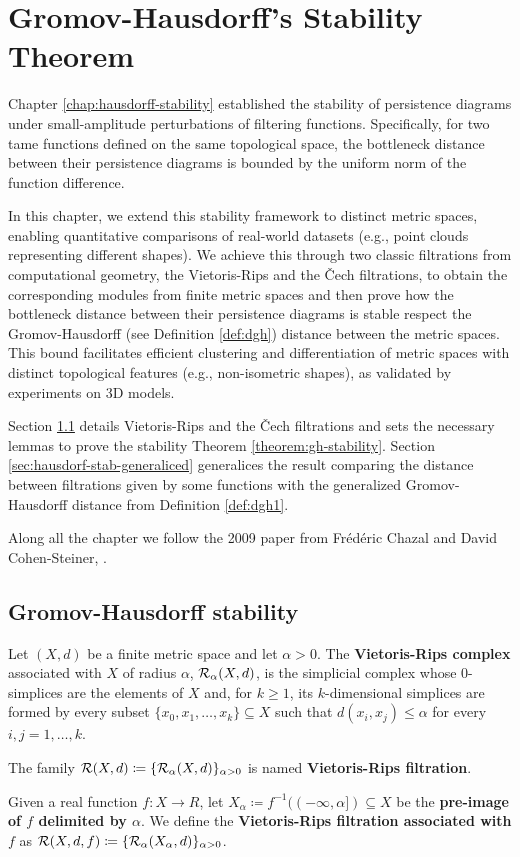 \chapter{Gromov-Hausdorff's Stability Theorem} \label{chapter:gromov-hausdorf-stability}
Chapter \ref{chap:hausdorff-stability} established the stability of persistence diagrams under small-amplitude perturbations of filtering functions. Specifically, for two tame functions defined on the same topological space, the bottleneck distance between their persistence diagrams is bounded by the uniform norm of the function difference.

In this chapter, we extend this stability framework to distinct metric spaces, enabling quantitative comparisons of real-world datasets (e.g., point clouds representing different shapes). We achieve this through two classic filtrations from computational geometry, the Vietoris-Rips and the Čech filtrations, to obtain the corresponding modules from finite metric spaces and then prove how the bottleneck distance between their persistence diagrams is stable respect the Gromov-Hausdorff (see Definition \ref{def:dgh}) distance between the metric spaces. This bound facilitates efficient clustering and differentiation of metric spaces with distinct topological features (e.g., non-isometric shapes), as validated by experiments on 3D models. 

Section \ref{sec:hausdorf-stab} details Vietoris-Rips and the Čech filtrations and sets the necessary lemmas to prove the stability Theorem \ref{theorem:gh-stability}. Section \ref{sec:hausdorf-stab-generaliced} generalices the result comparing the distance between filtrations given by some functions with the generalized Gromov-Hausdorff distance from Definition \ref{def:dgh1}.

Along all the chapter we follow the 2009 paper from Frédéric Chazal and David Cohen-Steiner, \cite{chazal}.

\section{Gromov-Hausdorff stability} \label{sec:hausdorf-stab}

\begin{definition}
    Let $ (X, d) $ be a finite metric space and let $ \alpha > 0 $. The {\bf Vietoris-Rips complex} associated with $ X $ of radius $ \alpha $, $\mathcal{R}_\alpha(X, d)$, is the simplicial complex whose $0$-simplices are the elements of $X$ and, for $k \geq 1$, its $k$-dimensional simplices are formed by every subset $ \{x_0, x_1, \dots, x_k\} \subseteq X $ such that $d(x_i, x_j) \leq \alpha $ for every $i, j = 1, \dots, k$.

    The family $ \mathcal{R}(X, d) \coloneq \{\mathcal{R}_\alpha(X, d)\}_{\alpha>0}$ is named {\bf Vietoris-Rips filtration}. 

    Given a real function $ f \colon X \to R $, let $ X_\alpha \coloneq f^{-1}((-\infty, \alpha]) \subseteq X $ be the {\bf pre-image of $f$ delimited by $ \alpha $}. We define the {\bf Vietoris-Rips filtration associated with $ f $} as $ \mathcal{R}(X, d, f) \coloneq \{\mathcal{R}_\alpha(X_\alpha, d)\}_{\alpha>0}$.

\end{definition}

